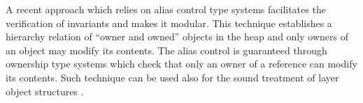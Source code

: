 	A recent approach which relies on alias control type systems \cite{DietlMueller05,Naumann-vstteFAC} facilitates the verification of invariants and 
	makes it modular. This technique establishes a hierarchy  relation of ``owner and owned'' objects  in the heap and only owners of an object may modify its contents.
	The alias control is guaranteed through ownership type systems which check that only an owner of a reference can modify its contents. 
	Such technique  can be used also for the sound treatment of layer object structures \cite{Mueller-Poetzsch-Heffter-Leavens06}.
	
	
	

        
  

